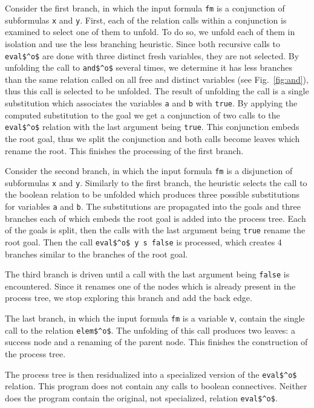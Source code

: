 Consider the first branch, in which the input formula \lstinline{fm} is a conjunction of subformulas \lstinline{x} and \lstinline{y}.
First, each of the relation calls within a conjunction is examined to select one of them to unfold.
To do so, we unfold each of them in isolation and use the less branching heuristic.
Since both recursive calls to \lstinline{eval$^o$} are done with three distinct fresh variables, they are not selected.
By unfolding the call to \lstinline{and$^o$} several times, we determine it has less branches than the same relation called on all free and distinct variables (see Fig.~\ref{fig:and}), thus this call is selected to be unfolded.
The result of unfolding the call is a single substitution which associates the variables \lstinline{a} and \lstinline{b} with \lstinline{true}.
By applying the computed substitution to the goal we get a conjunction of two calls to the \lstinline{eval$^o$} relation with the last argument being \lstinline{true}.
This conjunction embeds the root goal, thus we split the conjunction and both calls become leaves which rename the root.
This finishes the processing of the first branch.

Consider the second branch, in which the input formula \lstinline{fm} is a disjunction of subformulas \lstinline{x} and \lstinline{y}.
Similarly to the first branch, the heuristic selects the call to the boolean relation to be unfolded which produces three possible substitutions for variables \lstinline{a} and \lstinline{b}.
The substitutions are propagated into the goals and three branches each of which embeds the root goal is added into the process tree.
Each of the goals is split, then the calls with the last argument being \lstinline{true} rename the root goal.
Then the call \lstinline{eval$^o$ y s false} is processed, which creates 4 branches similar to the branches of the root goal.

The third branch is driven until a call with the last argument being \lstinline{false} is encountered.
Since it renames one of the nodes which is already present in the process tree, we stop exploring this branch and add the back edge.

The last branch, in which the input formula \lstinline{fm} is a variable \lstinline{v}, contain the single call to the relation \lstinline{elem$^o$}.
The unfolding of this call produces two leaves: a success node and a renaming of the parent node.
This finishes the construction of the process tree.

The process tree is then residualized into a specialized version of the \lstinline{eval$^o$} relation.
This program does not contain any calls to boolean connectives.
Neither does the program contain the original, not specialized, relation \lstinline{eval$^o$}.


